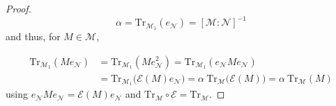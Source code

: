 \documentclass[a4paper,11pt]{article}
\begin{document}
\begin{proof}
    \begin{equation}
        \alpha = \mathrm{Tr}_{\mathcal{M}_1} (e_{\mathcal{N}}) = [\mathcal{M} : \mathcal{N}]^{-1}
    \end{equation}
    and thus, for $M \in \mathcal{M}$,

    \begin{equation}
        \begin{split}
            \mathrm{Tr}_{\mathcal{M}_1} (M e_{\mathcal{N}}) &= \mathrm{Tr}_{\mathcal{M}_1} (M e_{\mathcal{N}}^2) = \mathrm{Tr}_{\mathcal{M}_1} (e_{\mathcal{N}} M e_{\mathcal{N}}) \\
            &= \mathrm{Tr}_{\mathcal{M}_1} \big( \mathcal{E}(M) e_{\mathcal{N}} \big) = \alpha \ \mathrm{Tr}_{\mathcal{M}} \big( \mathcal{E}(M) \big) = \alpha \ \mathrm{Tr}_{\mathcal{M}}(M)
        \end{split}
    \end{equation}
    using $e_{\mathcal{N}} M e_{\mathcal{N}} = \mathcal{E}(M) e_{\mathcal{N}}$ and $\mathrm{Tr}_{\mathcal{M}} \circ \mathcal{E} = \mathrm{Tr}_{\mathcal{M}}$.
\end{proof}
\appendix




\end{document}
